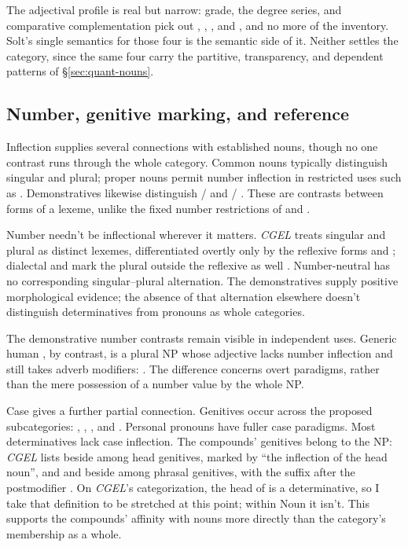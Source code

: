\documentclass[12pt]{article}
\begin{document}
The adjectival profile is real but narrow: grade, the degree series, and comparative complementation pick out , , , and , and no more of the inventory. Solt's single semantics for those four is the semantic side of it. Neither settles the category, since the same four carry the partitive, transparency, and dependent patterns of §\ref{sec:quant-nouns}.

\subsection{Number, genitive marking, and reference}\label{sec:inflection}

Inflection supplies several connections with established nouns, though no one contrast runs through the whole category. Common nouns typically distinguish singular and plural; proper nouns permit number inflection in restricted uses such as  \citep[521]{huddleston2002}. Demonstratives likewise distinguish / and / \citep[373]{huddleston2002}. These are contrasts between forms of a lexeme, unlike the fixed number restrictions of  and .

Number needn't be inflectional wherever it matters. \textit{CGEL} treats singular and plural  as distinct lexemes, differentiated overtly only by the reflexive forms  and  \citep[486]{huddleston2002}; dialectal  and  mark the plural outside the reflexive as well \citep[1466, n.~9]{huddleston2002}. Number-neutral  has no corresponding singular--plural alternation. The demonstratives supply positive morphological evidence; the absence of that alternation elsewhere doesn't distinguish determinatives from pronouns as whole categories.

The demonstrative number contrasts remain visible in independent uses. Generic human , by contrast, is a plural NP whose adjective lacks number inflection and still takes adverb modifiers:  \citep[418]{huddleston2002}. The difference concerns overt paradigms, rather than the mere possession of a number value by the whole NP.

Case gives a further partial connection. Genitives occur across the proposed subcategories: , , , and . Personal pronouns have fuller case paradigms. Most determinatives lack case inflection. The compounds' genitives belong to the NP: \textit{CGEL} lists  beside  among head genitives, marked by \enquote{the inflection of the head noun}, and  and  beside  among phrasal genitives, with the suffix after the postmodifier \citep[479]{huddleston2002}. On \textit{CGEL}'s categorization, the head of  is a determinative, so I take that definition to be stretched at this point; within Noun it isn't. This supports the compounds' affinity with nouns more directly than the category's membership as a whole.
\end{document}

